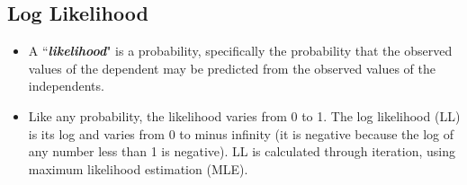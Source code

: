 \documentclass[a4paper,12pt]{article}
\begin{document}


\subsection{Log Likelihood}
\begin{itemize}
	\item A ``\textbf{\textit{likelihood}}" is a probability, specifically the probability that the observed values of the dependent may be predicted from the observed values of the independents. 

\item Like any probability, the likelihood varies from 0 to 1. The log likelihood (LL) is its log and varies from 0 to minus infinity (it is negative because the log of any number less than 1 is negative). LL is calculated through iteration, using maximum likelihood estimation (MLE).
\end{itemize}
\end{document}
